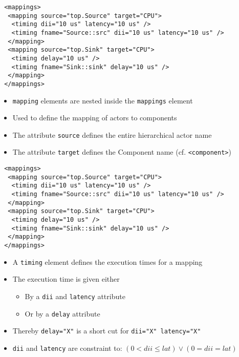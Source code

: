 \begin{frame}[fragile=singleslide]
\begin{lstlisting}
 <mappings>
  <mapping source="top.Source" target="CPU">
   <timing dii="10 us" latency="10 us" />
   <timing fname="Source::src" dii="10 us" latency="10 us" />
  </mapping>
  <mapping source="top.Sink" target="CPU">
   <timing delay="10 us" />
   <timing fname="Sink::sink" delay="10 us" />
  </mapping>
 </mappings>
\end{lstlisting}
\begin{itemize}
\item \lstinline!mapping! elements are nested inside the \lstinline!mappings! element
\item Used to define the mapping of actors to components
\item The attribute \lstinline!source! defines the entire hierarchical actor name
\item The attribute \lstinline!target! defines the Component name (cf. \lstinline!<component>!)
\end{itemize}
\end{frame}


\begin{frame}[fragile=singleslide]
\begin{lstlisting}
 <mappings>
  <mapping source="top.Source" target="CPU">
   <timing dii="10 us" latency="10 us" />
   <timing fname="Source::src" dii="10 us" latency="10 us" />
  </mapping>
  <mapping source="top.Sink" target="CPU">
   <timing delay="10 us" />
   <timing fname="Sink::sink" delay="10 us" />
  </mapping>
 </mappings>
\end{lstlisting}
\begin{itemize}
\item A \lstinline!timing! element defines the execution times for a mapping
\item The execution time is given either
\begin{itemize}
\item By a \lstinline!dii! and  \lstinline!latency! attribute
\item Or by a \lstinline!delay! attribute
\end{itemize}
\item Thereby \lstinline!delay="X"! is a short cut for \lstinline!dii="X" latency="X"!
\item \lstinline!dii! and \lstinline!latency! are constraint to: $(0 < dii \le lat) \vee (0=dii=lat)$
\end{itemize}
\vfill
\end{frame}


